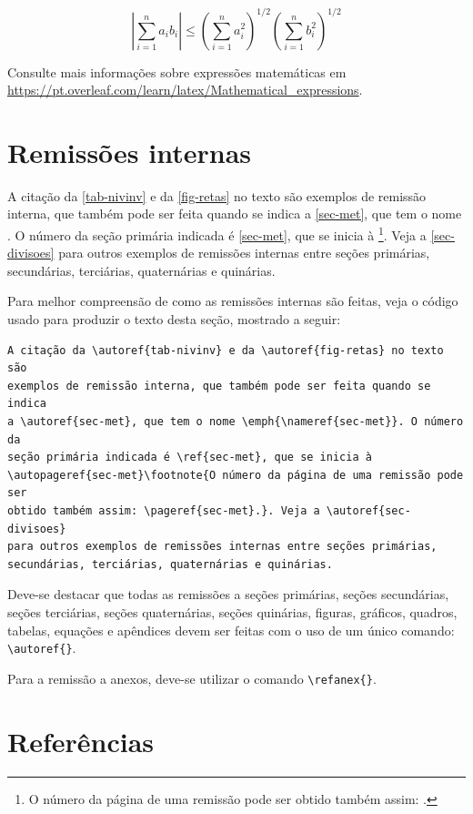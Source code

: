 \[
\left|\sum_{i=1}^n a_ib_i\right|
\le
\left(\sum_{i=1}^n a_i^2\right)^{1/2}
\left(\sum_{i=1}^n b_i^2\right)^{1/2}
\]

Consulte mais informações sobre expressões matemáticas em
\url{https://pt.overleaf.com/learn/latex/Mathematical_expressions}.

\section{Remissões internas}

A citação da \autoref{tab-nivinv} e da \autoref{fig-retas} no texto são exemplos de remissão interna, que também pode ser feita quando se indica a
\autoref{sec-met}, que tem o nome \emph{}. O número
da seção primária indicada é \ref{sec-met}, que se inicia à
\footnote{O número da página de uma remissão pode ser
obtido também assim: \pageref{sec-met}.}. Veja a \autoref{sec-divisoes} para outros exemplos de remissões internas entre seções primárias, secundárias, terciárias, quaternárias e quinárias.

Para melhor compreensão de como as remissões internas são feitas, veja o código usado para produzir o texto desta seção, mostrado a seguir:

\begin{verbatim}
A citação da \autoref{tab-nivinv} e da \autoref{fig-retas} no texto são
exemplos de remissão interna, que também pode ser feita quando se indica
a \autoref{sec-met}, que tem o nome \emph{\nameref{sec-met}}. O número da
seção primária indicada é \ref{sec-met}, que se inicia à
\autopageref{sec-met}\footnote{O número da página de uma remissão pode ser
obtido também assim: \pageref{sec-met}.}. Veja a \autoref{sec-divisoes} 
para outros exemplos de remissões internas entre seções primárias,
secundárias, terciárias, quaternárias e quinárias.
\end{verbatim}

Deve-se destacar que todas as remissões a seções primárias, seções secundárias, seções terciárias, seções quaternárias, seções quinárias, figuras, gráficos, quadros, tabelas, equações e apêndices devem ser feitas com o uso de um único comando: \verb|\autoref{}|. 

Para a remissão a anexos, deve-se utilizar o comando \verb|\refanex{}|. 

\section{Referências}\label{sec-refer}


